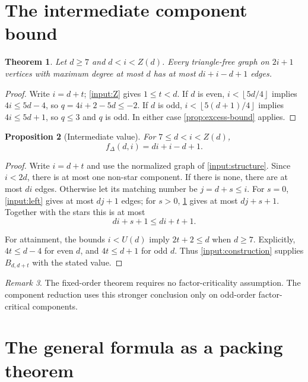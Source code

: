 \documentclass[11pt]{article}
\newtheorem{theorem}{Theorem}[section]
\newtheorem{proposition}[theorem]{Proposition}
\theoremstyle{definition}
\theoremstyle{remark}
\newtheorem{remark}[theorem]{Remark}
\newcommand{\fDelta}{f_{\Delta}}
\newcommand{\floor}[1]{\left\lfloor #1\right\rfloor}
\begin{document}
\section{The intermediate component bound}\label{sec:conj21}

\begin{theorem}\label{thm:fixed-order}
Let $d\ge7$ and $d<i<Z(d)$. Every triangle-free graph on $2i+1$ vertices
with maximum degree at most $d$ has at most $di+i-d+1$ edges.
\end{theorem}

\begin{proof}
Write $i=d+t$; \cref{input:Z} gives $1\le t<d$.
If $d$ is even, $i<\floor{5d/4}$ implies $4i\le5d-4$, so
$q=4i+2-5d\le-2$.
If $d$ is odd, $i<\floor{5(d+1)/4}$ implies $4i\le5d+1$,
so $q\le3$ and $q$ is odd.
In either case \cref{prop:excess-bound} applies.
\end{proof}

\begin{proposition}[Intermediate value]\label{thm:conj21}
For $7\le d<i<Z(d)$,
\[
  \fDelta(d,i)=di+i-d+1.
\]
\end{proposition}

\begin{proof}
Write $i=d+t$ and use the normalized graph of \cref{input:structure}.
Since $i<2d$, there is at most one non-star component. If there is none,
there are at most $di$ edges. Otherwise let its matching number be
$j=d+s\le i$. For $s=0$, \cref{input:left} gives at most $dj+1$ edges;
for $s>0$, \cref{thm:fixed-order} gives at most $dj+s+1$.
Together with the stars this is at most
\[
  di+s+1\le di+t+1.
\]

For attainment, the bounds $i<U(d)$ imply $2t+2\le d$ when $d\ge7$.
Explicitly, $4t\le d-4$ for even $d$, and $4t\le d+1$ for odd $d$.
Thus \cref{input:construction} supplies $B_{d,d+t}$ with the stated value.
\end{proof}

\begin{remark}
The fixed-order theorem requires no factor-criticality assumption. The
component reduction uses this stronger conclusion only on odd-order
factor-critical components.
\end{remark}

\section{The general formula as a packing theorem}\label{sec:packing}
\end{document}
